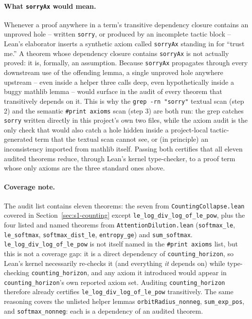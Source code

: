 \documentclass[11pt]{article}
\begin{document}
\paragraph{What \texttt{sorryAx} would mean.} Whenever a proof anywhere in a
term's transitive dependency closure contains an unproved hole -- written
\texttt{sorry}, or produced by an incomplete tactic block -- Lean's elaborator
inserts a synthetic axiom called \texttt{sorryAx} standing in for ``trust me.''
A theorem whose dependency closure contains \texttt{sorryAx} is not actually
proved: it is, formally, an assumption. Because \texttt{sorryAx} propagates
through every downstream use of the offending lemma, a single unproved hole
anywhere upstream -- even inside a helper three calls deep, even hypothetically
inside a buggy mathlib lemma -- would surface in the audit of every theorem
that transitively depends on it. This is why the \texttt{grep -rn "sorry"}
textual scan (step 2) and the semantic \texttt{\#print axioms} scan (step 3)
are both run: the grep catches \texttt{sorry} written directly in this
project's own two files, while the axiom audit is the only check that would
also catch a hole hidden inside a project-local tactic-generated term that the
textual scan cannot see, or (in principle) an inconsistency imported from
mathlib itself. Passing both certifies that all eleven audited theorems
reduce, through Lean's kernel type-checker, to a proof term whose only axioms
are the three standard ones above.

\paragraph{Coverage note.} The audit list contains eleven theorems: the seven
from \texttt{CountingCollapse.lean} covered in
Section~\ref{sec:s1-counting} except \texttt{le\_log\_div\_log\_of\_le\_pow},
plus the four listed and named theorems from
\texttt{AttentionDilution.lean} (\texttt{softmax\_le}, \texttt{le\_softmax},
\texttt{softmax\_dist\_le}, \texttt{entropy\_ge}) and \texttt{sum\_softmax}.
\texttt{le\_log\_div\_log\_of\_le\_pow} is not itself named in the
\texttt{\#print axioms} list, but this is not a coverage gap: it is a direct
dependency of \texttt{counting\_horizon}, so Lean's kernel necessarily
re-checks it (and everything \emph{it} depends on) while type-checking
\texttt{counting\_horizon}, and any axiom it introduced would appear in
\texttt{counting\_horizon}'s own reported axiom set. Auditing
\texttt{counting\_horizon} therefore already certifies
\texttt{le\_log\_div\_log\_of\_le\_pow} transitively. The same reasoning
covers the unlisted helper lemmas \texttt{orbitRadius\_nonneg},
\texttt{sum\_exp\_pos}, and \texttt{softmax\_nonneg}: each is a dependency of
an audited theorem.
\end{document}
